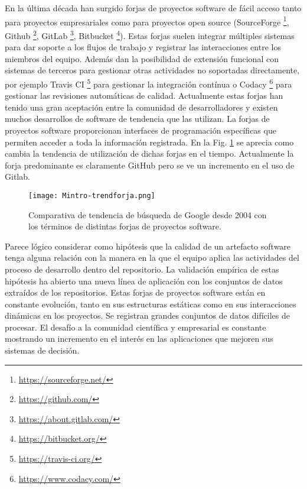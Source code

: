 En la última década han surgido forjas de proyectos software de fácil acceso tanto para proyectos empresariales como para proyectos open source (SourceForge \footnote{\url{https://sourceforge.net/}}, Github \footnote{\url{https://github.com/}}, GitLab \footnote{\url{https://about.gitlab.com/}}, Bitbucket  \footnote{\url{https://bitbucket.org/}}).  Estas forjas suelen integrar múltiples sistemas para dar soporte a los flujos de trabajo y registrar las interacciones entre los miembros del equipo. Además dan la posibilidad de extensión funcional con sistemas de terceros para gestionar otras actividades no soportadas directamente, por ejemplo Travis CI
\footnote{\url{https://travis-ci.org/}} para gestionar la integración contínua o Codacy \footnote{\url{https://www.codacy.com/}} para gestionar las revisiones automáticas de calidad. Actualmente estas forjas han tenido una gran aceptación entre la comunidad de desarrolladores y existen muchos desarrollos de software de tendencia que las utilizan. La forjas de proyectos software proporcionan interfaces de programación específicas que permiten acceder a toda la información registrada. 
En la Fig. \ref{fig:Mintro-trendforja} se aprecia como cambia la tendencia de utilización de dichas forjas en el tiempo. Actualmente la forja predominante es claramente GitHub pero se ve un incremento en el uso de Gitlab.

\begin{figure}[!h]
	\centering
	\texttt{[image: Mintro-trendforja.png]}
	\caption{Comparativa de tendencia de búsqueda de Google desde 2004 con los términos de distintas forjas de proyectos software.}
	\label{fig:Mintro-trendforja}
\end{figure}



 
Parece lógico considerar como hipótesis que la calidad de un artefacto software tenga alguna relación con la manera en la que el equipo  aplica las actividades del proceso de desarrollo dentro del repositorio.  
La validación empírica de estas  hipótesis ha abierto una nueva línea de aplicación con los conjuntos de datos extraídos de los repositorios.  
Estas forjas de proyectos software están en constante evolución, tanto en sus estructuras estáticas como en sus interacciones dinámicas en los proyectos. Se registran grandes conjuntos de datos difíciles de procesar. El  desafío a la comunidad científica y empresarial  es constante mostrando un incremento en el interés en las aplicaciones que mejoren sus sistemas de decisión.

